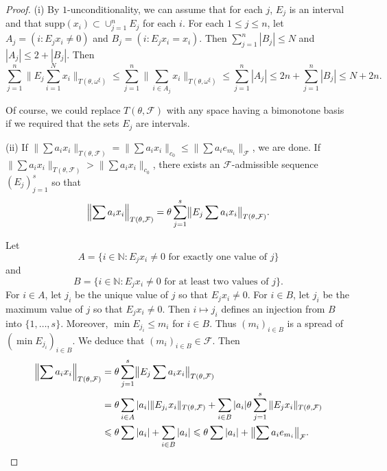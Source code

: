 \documentclass[12pt]{amsart}
\theoremstyle{definition}
\newcommand{\nn}{\mathbb{N}}
\newcommand{\fff}{\mathcal{F}}
\newcommand{\supp}{\mathrm{supp}}
\begin{document}
\begin{proof} (i) By $1$-unconditionality, we can assume that for each $j$, $E_j$ is an interval and that $\supp(x_i)\subset \cup_{j=1}^n E_j$ for each $i$.  For each $1\leqslant j\leqslant n$, let $A_j=(i: E_jx_i\neq 0)$ and $B_j=(i: E_jx_i=x_i)$.  Then $\sum_{j=1}^n |B_j|\leqslant N$ and $|A_j|\leqslant 2+|B_j|$.  Then $$\sum_{j=1}^n \|E_j \sum_{i=1}^N x_i\|_{T(\theta, \omega^\xi)}\leqslant\sum_{j=1}^n \|\sum_{i\in A_j}x_i\|_{T(\theta, \omega^\xi)} \leqslant \sum_{j=1}^n |A_j|\leqslant 2n +\sum_{j=1}^n |B_j|\leqslant N+2n.$$  


Of course, we could replace $T(\theta, \fff)$ with any space having a bimonotone basis if we required that the sets $E_j$ are intervals. 


(ii) If $\|\sum a_ix_i\|_{T(\theta, \fff)}=\|\sum a_ix_i\|_{c_0}\leqslant \|\sum a_ie_{m_i}\|_\fff$, we are done.  If $\|\sum a_ix_i\|_{T(\theta, \fff)}> \|\sum a_ix_i\|_{c_0}$, there exists an $\fff$-admissible sequence $(E_j)_{j=1}^s$ so that $$\Bigl\|\sum a_ix_i\Bigr\|_{T(\theta, \fff)} = \theta\sum_{j=1}^s \bigl\|E_j \sum a_ix_i\bigr\|_{T(\theta, \fff)}.$$   

Let $$A=\{i\in \nn: E_jx_i\neq 0 \text{\ for exactly one value of\ }j\}$$ and $$B=\{i\in \nn: E_jx_i\neq 0 \text{\ for at least two values of\ }j\}.$$  For $i\in A$, let $j_i$ be the unique value of $j$ so that $E_jx_i\neq 0$.  For $i\in B$, let $j_i$ be the maximum value of $j$ so that $E_jx_i\neq 0$.  Then $i\mapsto j_i$ defines an injection from $B$ into $\{1, \ldots, s\}$.  Moreover, $\min E_{j_i}\leqslant m_i$ for $i\in B$.  Thus $(m_i)_{i\in B}$ is a spread of $(\min E_{j_i})_{i\in B}$.  We deduce that $(m_i)_{i\in B}\in \fff$.  Then \begin{align*} \Bigl\|\sum a_ix_i\Bigr\|_{T(\theta, \fff)} & = \theta \sum_{j=1}^s \bigl\|E_j \sum a_ix_i\bigr\|_{T(\theta, \fff)} \\ & = \theta\sum_{i\in A} |a_i|\|E_{j_i}x_i\|_{T(\theta, \fff)} + \sum_{i\in B} |a_i|\theta\sum_{j=1}^s \|E_j x_i\|_{T(\theta, \fff)} \\ & \leqslant \theta\sum |a_i| + \sum_{i\in B} |a_i| \leqslant \theta \sum |a_i|+ \bigl\|\sum a_ie_{m_i}\bigr\|_\fff.\end{align*}

\end{proof}
\end{document}
